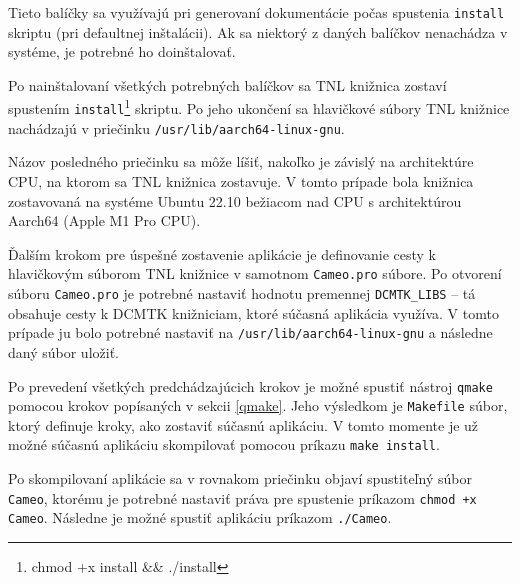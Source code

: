 {Tieto balíčky sa využívajú pri generovaní dokumentácie počas spustenia \texttt{install} skriptu (pri defaultnej inštalácii). Ak sa niektorý z daných balíčkov nenachádza v systéme, je potrebné ho doinštalovať.

Po nainštalovaní všetkých potrebných balíčkov sa TNL knižnica zostaví spustením \texttt{install}\footnote{chmod +x install \&\& ./install} skriptu. Po jeho ukončení sa hlavičkové súbory TNL knižnice nachádzajú v priečinku \texttt{/usr/lib/aarch64-linux-gnu}.

\clearpage
Názov posledného priečinku sa môže líšiť, nakoľko je závislý na architektúre CPU, na ktorom sa TNL knižnica zostavuje. V tomto prípade bola knižnica zostavovaná na systéme Ubuntu 22.10 bežiacom nad CPU s architektúrou Aarch64 (Apple M1 Pro CPU).

Ďalším krokom pre úspešné zostavenie aplikácie je definovanie cesty k hlavičkovým súborom TNL knižnice v samotnom \texttt{Cameo.pro} súbore. Po otvorení súboru \texttt{Cameo.pro} je potrebné nastaviť hodnotu premennej \lstinline{DCMTK_LIBS} -- tá obsahuje cesty k DCMTK knižniciam, ktoré súčasná aplikácia využíva. V tomto prípade ju bolo potrebné nastaviť na \texttt{/usr/lib/aarch64-linux-gnu} a následne daný súbor uložiť.

Po prevedení všetkých predchádzajúcich krokov je možné spustiť nástroj \texttt{qmake} pomocou krokov popísaných v sekcii \ref{qmake}. Jeho výsledkom je \texttt{Makefile} súbor, ktorý definuje kroky, ako zostaviť súčasnú aplikáciu. V tomto momente je už možné súčasnú aplikáciu skompilovať pomocou príkazu \texttt{make install}.

Po skompilovaní aplikácie sa v rovnakom priečinku objaví spustiteľný súbor \texttt{Cameo}, ktorému je potrebné nastaviť práva pre spustenie príkazom \texttt{chmod +x Cameo}. Následne je možné spustiť aplikáciu príkazom \texttt{./Cameo}. \clearpage

}
